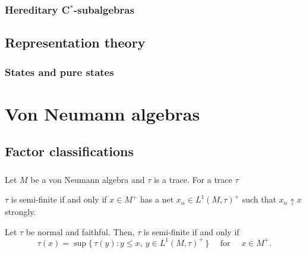 \documentclass{../../large}
\begin{document}
\begin{prb}
\end{prb}



\section{Hereditary C$^*$-subalgebras}
\begin{prb}

\end{prb}

\chapter{Representation theory}
\section{States and pure states}



\chapter{}













\part{Von Neumann algebras}

\chapter{Factor classifications}

\section{}
\begin{prb}
Let $M$ be a von Neumann algebra and $\tau$ is a trace.
For a trace $\tau$
\begin{parts}
\item $\tau$ is semi-finite if and only if $x\in M^+$ has a net $x_\alpha\in L^1(M,\tau)^+$ such that $x_\alpha\uparrow x$ strongly.
\item Let $\tau$ be normal and faithful. Then, $\tau$ is semi-finite if and only if
\[\tau(x)=\sup\{\,\tau(y):y\le x,\ y\in L^1(M,\tau)^+\,\}\quad\text{ for }\quad x\in M^+.\]
\end{parts}
\end{prb}
\end{document}
